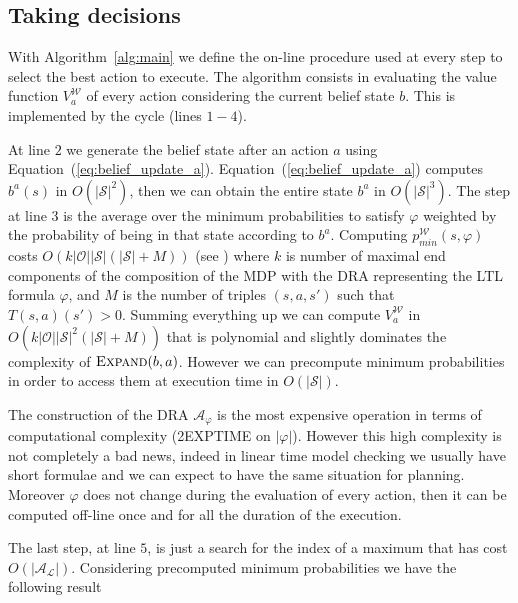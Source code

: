 \vspace{-1cm}
\subsection{Taking decisions} %
\label{sub:algorithm}

With Algorithm~\ref{alg:main} we define the on-line procedure used at every step to select the best action to execute. The algorithm consists in evaluating the value function $V_a^\mathcal{W}$ of every action considering the current belief state $b$. This is implemented by the cycle (lines $1-4$). 

At line $2$ we generate the belief state after an action $a$ using Equation~(\ref{eq:belief_update_a}). Equation~(\ref{eq:belief_update_a}) computes $b^a(s)$ in $O(|\mathcal{S}|^2)$, then we can obtain the entire state $b^a$ in $O(|\mathcal{S}|^3)$. The step at line $3$ is the
average over the minimum probabilities to satisfy $\varphi$ weighted by the probability of being in that state according to $b^a$. Computing $p^\mathcal{W}_{min}(s,\varphi)$ costs $O(k |\mathcal{O}| |\mathcal{S}|(|\mathcal{S}|+M))$ (see \cite[Theorem 10.127]{Katoen-Baier}) where $k$ is number of maximal end components of the composition of the \ac{MDP} with the \ac{DRA} representing the LTL formula $\varphi$, and $M$ is the number of triples $(s,a,s')$ such that $T(s,a)(s') > 0$. Summing everything up we can compute $V_{a}^\mathcal{W}$ in $O(k|\mathcal{O}||\mathcal{S}|^2(|\mathcal{S}|+M))$ that is polynomial and slightly dominates the complexity of $\textsc{Expand}(b,a)$. However we can precompute minimum probabilities in order to access them at execution time in $O(|\mathcal{S}|)$.

The construction of the \ac{DRA} $\mathcal{A}_\varphi$ is the most expensive operation in terms of computational complexity (2EXPTIME on $|\varphi|$). However this high complexity is not completely a bad news, indeed in linear time model checking we usually have short formulae and we can expect to have the same situation for planning. Moreover $\varphi$ does not change during the evaluation of every action, then it can be computed off-line once and for all the duration of the execution.

The last step, at line $5$, is just a search for the index of a maximum that has cost $O(|\mathcal{A}_\mathcal{L}|)$. %
Considering precomputed minimum probabilities we have the following result


